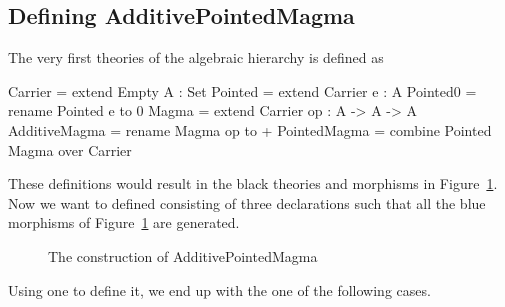 \subsection{Defining AdditivePointedMagma}
The very first theories of the algebraic hierarchy is defined as 
\begin{togcode} 
Carrier = extend Empty {A : Set}
Pointed = extend Carrier {e : A}
Pointed0 = rename Pointed {e to 0} 
Magma = extend Carrier {op : A -> A -> A}
AdditiveMagma = rename Magma {op to +} 
PointedMagma = combine Pointed {} Magma {} over Carrier
\end{togcode} 
These definitions would result in the black theories and morphisms in Figure~\ref{fig:addPointedMagma}. Now we want to defined  consisting of three declarations  such that all the blue morphisms of 
Figure~\ref{fig:addPointedMagma} are generated. 
\begin{figure}[h]
    \caption{The construction of AdditivePointedMagma}
    \label{fig:addPointedMagma}
\end{figure}
Using one  to define it, we end up with the one of the following cases. 
